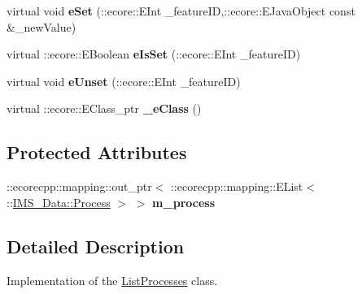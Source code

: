 \begin{DoxyCompactItemize}
\item 
\hypertarget{classIMS__Data_1_1ListProcesses_a7b56490a7f463477b4e2668329cac1f6}{
virtual void {\bfseries eSet} (::ecore::EInt \_\-featureID,::ecore::EJavaObject const \&\_\-newValue)}
\label{classIMS__Data_1_1ListProcesses_a7b56490a7f463477b4e2668329cac1f6}

\item 
\hypertarget{classIMS__Data_1_1ListProcesses_a1cdc87ee6e8fa772654c07b2279d8627}{
virtual ::ecore::EBoolean {\bfseries eIsSet} (::ecore::EInt \_\-featureID)}
\label{classIMS__Data_1_1ListProcesses_a1cdc87ee6e8fa772654c07b2279d8627}

\item 
\hypertarget{classIMS__Data_1_1ListProcesses_a14d806a6e021ea1460ac6996952ce5cc}{
virtual void {\bfseries eUnset} (::ecore::EInt \_\-featureID)}
\label{classIMS__Data_1_1ListProcesses_a14d806a6e021ea1460ac6996952ce5cc}

\item 
\hypertarget{classIMS__Data_1_1ListProcesses_a9089e0b6af7e6e699980b0507fec40a0}{
virtual ::ecore::EClass\_\-ptr {\bfseries \_\-eClass} ()}
\label{classIMS__Data_1_1ListProcesses_a9089e0b6af7e6e699980b0507fec40a0}

\end{DoxyCompactItemize}
\subsection*{Protected Attributes}
\begin{DoxyCompactItemize}
\item 
\hypertarget{classIMS__Data_1_1ListProcesses_a07607661c78f63fd2895958a2efd23c3}{
::ecorecpp::mapping::out\_\-ptr$<$ ::ecorecpp::mapping::EList$<$ ::\hyperlink{classIMS__Data_1_1Process}{IMS\_\-Data::Process} $>$ $>$ {\bfseries m\_\-process}}
\label{classIMS__Data_1_1ListProcesses_a07607661c78f63fd2895958a2efd23c3}

\end{DoxyCompactItemize}


\subsection{Detailed Description}
Implementation of the \hyperlink{classIMS__Data_1_1ListProcesses}{ListProcesses} class. 

